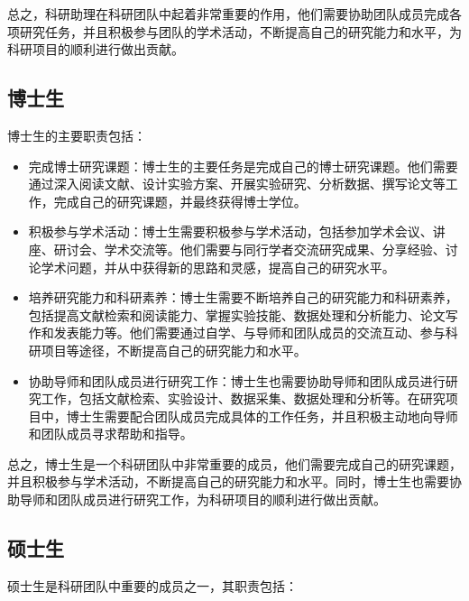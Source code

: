 \documentclass[
]{ctexbook}
\begin{document}
总之，科研助理在科研团队中起着非常重要的作用，他们需要协助团队成员完成各项研究任务，并且积极参与团队的学术活动，不断提高自己的研究能力和水平，为科研项目的顺利进行做出贡献。

\hypertarget{ux535aux58ebux751f}{%
\subsection{博士生}\label{ux535aux58ebux751f}}

博士生的主要职责包括：

\begin{itemize}
\item
  完成博士研究课题：博士生的主要任务是完成自己的博士研究课题。他们需要通过深入阅读文献、设计实验方案、开展实验研究、分析数据、撰写论文等工作，完成自己的研究课题，并最终获得博士学位。
\item
  积极参与学术活动：博士生需要积极参与学术活动，包括参加学术会议、讲座、研讨会、学术交流等。他们需要与同行学者交流研究成果、分享经验、讨论学术问题，并从中获得新的思路和灵感，提高自己的研究水平。
\item
  培养研究能力和科研素养：博士生需要不断培养自己的研究能力和科研素养，包括提高文献检索和阅读能力、掌握实验技能、数据处理和分析能力、论文写作和发表能力等。他们需要通过自学、与导师和团队成员的交流互动、参与科研项目等途径，不断提高自己的研究能力和水平。
\item
  协助导师和团队成员进行研究工作：博士生也需要协助导师和团队成员进行研究工作，包括文献检索、实验设计、数据采集、数据处理和分析等。在研究项目中，博士生需要配合团队成员完成具体的工作任务，并且积极主动地向导师和团队成员寻求帮助和指导。
\end{itemize}

总之，博士生是一个科研团队中非常重要的成员，他们需要完成自己的研究课题，并且积极参与学术活动，不断提高自己的研究能力和水平。同时，博士生也需要协助导师和团队成员进行研究工作，为科研项目的顺利进行做出贡献。

\hypertarget{ux7855ux58ebux751f}{%
\subsection{硕士生}\label{ux7855ux58ebux751f}}

硕士生是科研团队中重要的成员之一，其职责包括：
\end{document}
